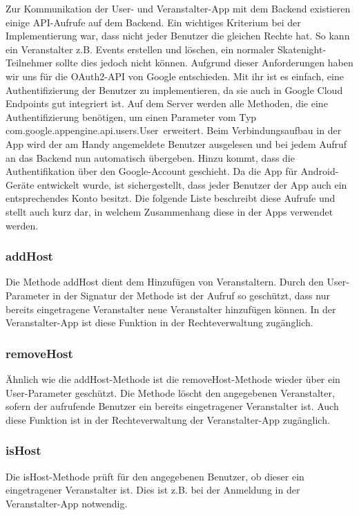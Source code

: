 Zur Kommunikation der User- und Veranstalter-App mit dem Backend existieren einige API-Aufrufe auf dem Backend. Ein wichtiges Kriterium bei der Implementierung war, dass nicht jeder Benutzer die gleichen Rechte hat. So kann ein Veranstalter z.B. Events erstellen und löschen, ein normaler Skatenight-Teilnehmer sollte dies jedoch nicht können. Aufgrund dieser Anforderungen haben wir uns für die OAuth2-API von Google entschieden. Mit ihr ist es einfach, eine Authentifizierung der Benutzer zu implementieren, da sie auch in Google Cloud Endpoints gut integriert ist. Auf dem Server werden alle Methoden, die eine Authentifizierung benötigen, um einen Parameter vom Typ \glqq com.google.appengine.api.users.User\grqq\ erweitert. Beim Verbindungsaufbau in der App wird der am Handy angemeldete Benutzer ausgelesen und bei jedem Aufruf an das Backend nun automatisch übergeben. Hinzu kommt, dass die Authentifikation über den Google-Account geschieht. Da die App für Android-Geräte entwickelt wurde, ist sichergestellt, dass jeder Benutzer der App auch ein entsprechendes Konto besitzt.
Die folgende Liste beschreibt diese Aufrufe und stellt auch kurz dar, in welchem Zusammenhang diese in der Apps verwendet werden.

\subsubsection*{addHost}
Die Methode addHost dient dem Hinzufügen von Veranstaltern. Durch den User-Parameter in der Signatur der Methode ist der Aufruf so geschützt, dass nur bereits eingetragene Veranstalter neue Veranstalter hinzufügen können. In der Veranstalter-App ist diese Funktion in der Rechteverwaltung zugänglich.

\subsubsection*{removeHost}
Ähnlich wie die addHost-Methode ist die removeHost-Methode wieder über ein User-Parameter geschützt. Die Methode löscht den angegebenen Veranstalter, sofern der aufrufende Benutzer ein bereits eingetragener Veranstalter ist. Auch diese Funktion ist in der Rechteverwaltung der Veranstalter-App zugänglich.

\subsubsection*{isHost}
Die isHost-Methode prüft für den angegebenen Benutzer, ob dieser ein eingetragener Veranstalter ist. Dies ist z.B. bei der Anmeldung in der Veranstalter-App notwendig.

